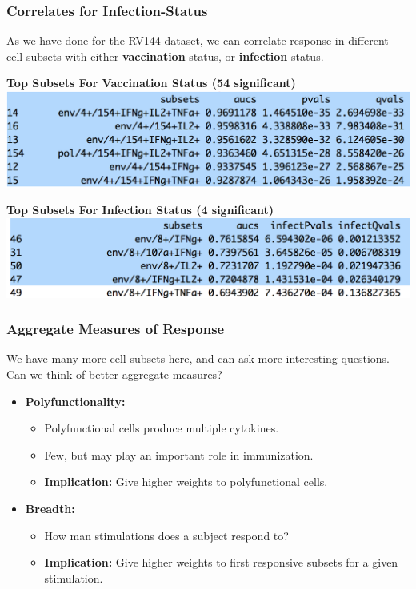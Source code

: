 \documentclass{beamer}
\theoremstyle{definition}
\begin{document}
\begin{frame}
\frametitle{Correlates for Infection-Status}
As we have done for the RV144 dataset, we can correlate response in different cell-subsets with either \textbf{vaccination} status, or \textbf{infection} status.

\begin{center}
\textbf{Top Subsets For Vaccination Status (54 significant)}
\includegraphics[width=10 cm]{figures/vaccineTable}
\end{center}

\begin{center}
\textbf{Top Subsets For Infection Status (4 significant)}
\includegraphics[width=10 cm]{figures/infectionTable}
\end{center}

\end{frame}


\begin{frame}
\frametitle{Aggregate Measures of Response}
We have many more cell-subsets here, and can ask more interesting questions. Can we think of better aggregate measures?

\vspace{0.2 cm}
\pause
\begin{itemize}
\item \textbf{Polyfunctionality:}
	\begin{itemize}
	\item Polyfunctional cells produce multiple cytokines.
	\item Few, but may play an important role in immunization. 
	\item \textbf{Implication:} Give higher weights to polyfunctional cells.
	\end{itemize}
	
\pause
\vspace{1 cm}
\item \textbf{Breadth:}
	\begin{itemize}
	\item How man stimulations does a subject respond to?
	\item \textbf{Implication:} Give higher weights to first responsive subsets for a given stimulation.
	\end{itemize}
\end{itemize}
\end{frame}
\end{document}
